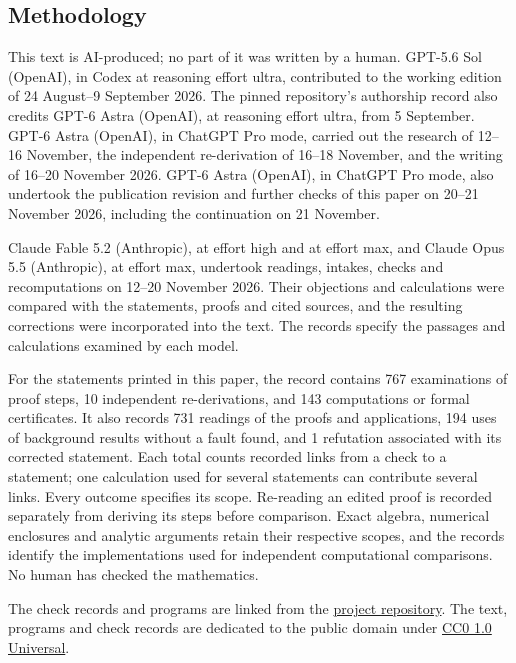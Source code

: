 \subsection{Methodology}
This text is AI-produced; no part of it was written by a human.
GPT-5.6 Sol (OpenAI), in Codex at reasoning effort ultra, contributed
to the working edition of 24 August--9 September 2026. The pinned
repository's authorship record also credits GPT-6 Astra (OpenAI),
at reasoning effort ultra, from 5 September.
GPT-6 Astra (OpenAI), in ChatGPT Pro mode, carried out the research
of 12--16 November, the independent re-derivation of 16--18 November,
and the writing of 16--20 November 2026. GPT-6 Astra (OpenAI),
in ChatGPT Pro mode, also undertook the publication revision and
further checks of this paper on 20--21 November 2026, including
the continuation on 21 November.

Claude Fable 5.2 (Anthropic), at effort high and at effort max,
and Claude Opus 5.5 (Anthropic), at effort max, undertook readings,
intakes, checks and recomputations on 12--20 November 2026.
Their objections and calculations were compared with the statements,
proofs and cited sources, and the resulting corrections were
incorporated into the text. The records specify the passages and
calculations examined by each model.

For the statements printed in this paper, the record contains
767 examinations of proof steps, 10 independent
re-derivations, and 143 computations or formal certificates.
It also records 731 readings of the proofs and applications,
194 uses of background results without a fault found,
and 1 refutation associated with its corrected statement.
Each total counts recorded links from a check to a statement;
one calculation used for several statements can contribute several
links. Every outcome specifies its scope. Re-reading an edited proof
is recorded separately from deriving its steps before comparison.
Exact algebra, numerical enclosures and analytic arguments retain
their respective scopes, and the records identify the implementations
used for independent computational comparisons.
No human has checked the mathematics.

The check records and programs are linked from the
\href{\SsixPublishRecords}{project repository}.
The text, programs and check records are dedicated to the public domain under
\href{https://creativecommons.org/publicdomain/zero/1.0/}{CC0 1.0 Universal}.


